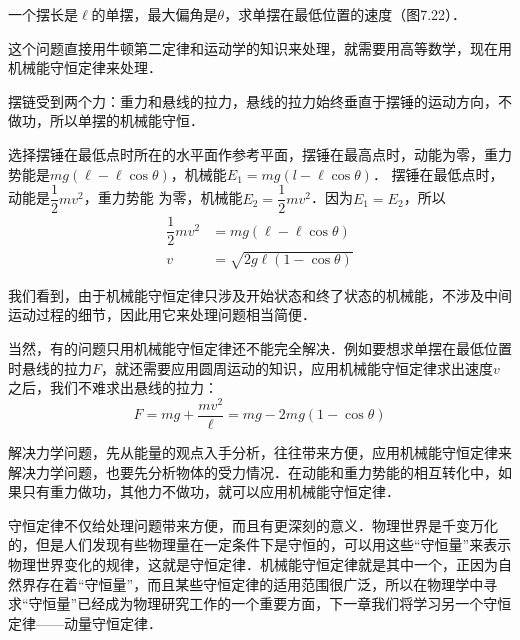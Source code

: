 \begin{example}
    一个摆长是$\ell$的单摆，最大偏角是$\theta$，求单摆在最低位置的速度（图7.22）．
\end{example}


\begin{solution}
    这个问题直接用牛顿第二定律和运动学的知识来处理，就需要用高等数学，现在用机械能守恒定律来处理．

摆链受到两个力：重力和悬线的拉力，悬线的拉力始终垂直于摆锤的运动方向，不做功，所以单摆的机械能守恒．

选择摆锤在最低点时所在的水平面作参考平面，摆锤在最高点时，动能为零，重力势能是$mg(\ell-\ell\cos\theta)$，机械能$E_1=mg(l-\ell\cos\theta)$． 摆锤在最低点时，动能是$\dfrac{1}{2}mv^2$，重力势能
为零，机械能$E_2=\dfrac{1}{2}mv^2$．因为$E_1=E_2$，所以
\[\begin{split}
    \dfrac{1}{2}mv^2&=mg(\ell-\ell\cos\theta)\\
    v&=\sqrt{2g\ell(1-\cos\theta)}
\end{split}\]
\end{solution}

我们看到，由于机械能守恒定律只涉及开始状态和终了状态的机械能，不涉及中间运动过程的细节，因此用它来处理问题相当简便．

当然，有的问题只用机械能守恒定律还不能完全解决．例如要想求单摆在最低位置时悬线的拉力$F$，就还需要应用圆周运动的知识，应用机械能守恒定律求出速度$v$之后，我们不难求出悬线的拉力：
\[F=mg+\frac{mv^2}{\ell}=mg-2mg (1-\cos\theta)\]

解决力学问题，先从能量的观点入手分析，往往带来方便，应用机械能守恒定律来解决力学问题，也要先分析物体的受力情况．在动能和重力势能的相互转化中，如果只有重力做功，其他力不做功，就可以应用机械能守恒定律．

守恒定律不仅给处理问题带来方便，而且有更深刻的意义．物理世界是千变万化的，但是人们发现有些物理量在一定条件下是守恒的，可以用这些“守恒量”来表示物理世界变化的规律，这就是守恒定律．机械能守恒定律就是其中一个，正因为自然界存在着“守恒量”，而且某些守恒定律的适用范围很广泛，所以在物理学中寻求“守恒量”已经成为物理研究工作的一个重要方面，下一章我们将学习另一个守恒定律——动量守恒定律．


